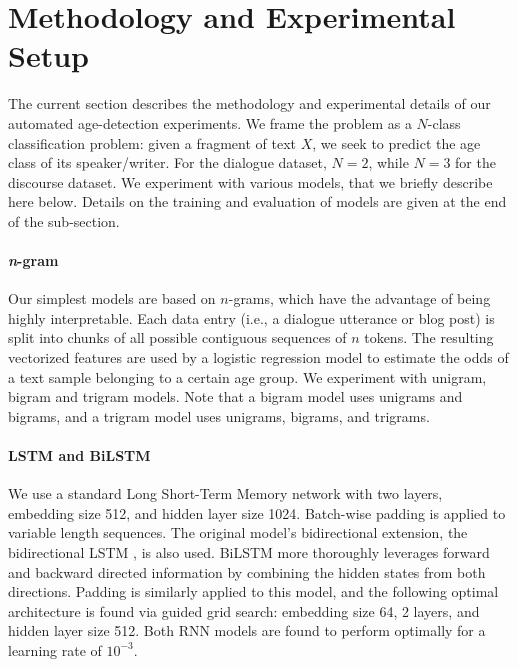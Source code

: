 \section{Methodology and Experimental Setup}
\label{sec:exp1_methods_exp_setup}

The current section describes the methodology and experimental details of our automated age-detection experiments. We frame the problem as a $N$-class classification problem: given a fragment of text $X$, we seek to predict
the age class of its speaker/writer.
For the dialogue dataset, $N=2$, while $N=3$ for the discourse dataset.
We experiment with various models, that we briefly describe here below. Details on the training and evaluation of models are given at the end of the sub-section.


\paragraph{\textit{n}-gram} 
Our simplest models are based on $n$-grams, which have the advantage of being highly interpretable.
Each data entry (i.e., a dialogue utterance or blog post) is split into chunks of all possible contiguous sequences of $n$ tokens. The resulting vectorized features are used by a logistic regression model to estimate the odds of a text sample belonging to a certain age group. We experiment with unigram, bigram and trigram models. Note that a bigram model uses unigrams and bigrams, and a trigram model uses unigrams, bigrams, and trigrams.

\paragraph{LSTM and BiLSTM} We
use a standard Long Short-Term Memory network \cite[LSTM;][]{hochreiter1997long} with two layers, embedding size 512, and hidden layer size 1024. Batch-wise padding is applied to variable length sequences. The original model's bidirectional extension, the bidirectional LSTM \cite[BiLSTM;][]{schuster1997bidirectional}, is also used.
BiLSTM more thoroughly leverages forward and backward directed information by combining the hidden states from both directions. Padding is similarly applied to this model, and the following optimal architecture is found via guided grid search: embedding size 64, 2 layers, and hidden layer size 512. Both RNN models are found to perform optimally for a learning rate of $10^{-3}$.

